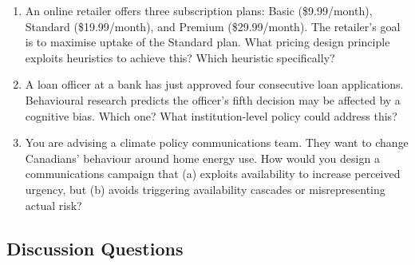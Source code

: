 \documentclass[12pt, letterpaper]{article}
\begin{document}
\begin{enumerate}
\item An online retailer offers three subscription plans: Basic (\$9.99/month), Standard (\$19.99/month), and Premium (\$29.99/month). The retailer's goal is to maximise uptake of the Standard plan. What pricing design principle exploits heuristics to achieve this? Which heuristic specifically?

\item A loan officer at a bank has just approved four consecutive loan applications. Behavioural research predicts the officer's fifth decision may be affected by a cognitive bias. Which one? What institution-level policy could address this?

\item You are advising a climate policy communications team. They want to change Canadians' behaviour around home energy use. How would you design a communications campaign that (a) exploits availability to increase perceived urgency, but (b) avoids triggering availability cascades or misrepresenting actual risk?
\end{enumerate}


\subsection{Discussion Questions}
\end{document}
